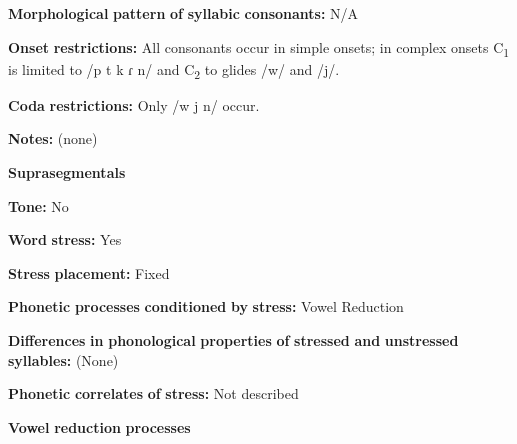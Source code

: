 \documentclass[output=paper]{langsci/langscibook}
\begin{document}
\begin{styleBody}
\textbf{Morphological} \textbf{pattern} \textbf{of} \textbf{syllabic} \textbf{consonants:} N/A
\end{styleBody}

\begin{styleBody}
\textbf{Onset} \textbf{restrictions:} All consonants occur in simple onsets; in complex onsets C\textsubscript{1} is limited to /p t k ɾ n/ and C\textsubscript{2} to glides /w/ and /j/.
\end{styleBody}

\begin{styleBody}
\textbf{Coda} \textbf{restrictions:} Only /w j n/ occur.
\end{styleBody}

\begin{styleBody}
\textbf{Notes:} (none)
\end{styleBody}

\begin{styleBody}
\textbf{Suprasegmentals}
\end{styleBody}

\begin{styleBody}
\textbf{Tone:} No
\end{styleBody}

\begin{styleBody}
\textbf{Word} \textbf{stress:} Yes
\end{styleBody}

\begin{styleBody}
\textbf{Stress} \textbf{placement:} Fixed
\end{styleBody}

\begin{styleBody}
\textbf{Phonetic} \textbf{processes} \textbf{conditioned} \textbf{by} \textbf{stress:} Vowel Reduction
\end{styleBody}

\begin{styleBody}
\textbf{Differences} \textbf{in} \textbf{phonological} \textbf{properties} \textbf{of} \textbf{stressed} \textbf{and} \textbf{unstressed} \textbf{syllables:} (None)
\end{styleBody}

\begin{styleBody}
\textbf{Phonetic} \textbf{correlates} \textbf{of} \textbf{stress:} Not described
\end{styleBody}

\begin{styleBody}
\textbf{Vowel} \textbf{reduction} \textbf{processes}
\end{styleBody}
\end{document}
